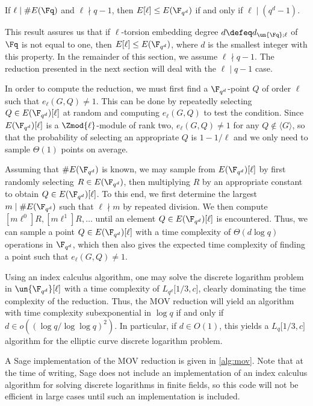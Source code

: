 \begin{thm}{}{}
If $\ell \mid \#E(\Fq)$ and $\ell \nmid q - 1$, then $E[\ell] \leq E(\F_{q^d})$ if and only if $\ell \mid (q^d - 1)$.
\end{thm}

This result assures us that if $\ell$-torsion embedding degree $d \defeq d_{\un{\Fq};\ell}$ of $\Fq$ is not equal to one, then $E[\ell] \leq E(\F_{q^d})$, where $d$ is the smallest integer with this property. In the remainder of this section, we assume $\ell \nmid q - 1$. The reduction presented in the next section will deal with the $\ell \mid q - 1$ case.

In order to compute the reduction, we must first find a $\F_{q^d}$-point $Q$ of order $\ell$ such that $e_\ell(G, Q) \neq 1$. This can be done by repeatedly selecting $Q \in E(\F_{q^d})[\ell]$ at random and computing $e_\ell(G, Q)$ to test the condition. Since $E(\F_{q^d})[\ell]$ is a $\Zmod{\ell}$-module of rank two, $e_\ell(G, Q) \neq 1$ for any $Q \notin \langle G \rangle$, so that the probability of selecting an appropriate $Q$ is $1 - 1 / \ell$ and we only need to sample $\Theta(1)$ points on average.

Assuming that $\#E(\F_{q^d})$ is known, we may sample from $E(\F_{q^d})[\ell]$ by first randomly selecting $R \in E(\F_{q^d})$, then multiplying $R$ by an appropriate constant to obtain $Q \in E(\F_{q^d})[\ell]$. To this end, we first determine the largest $m \mid \#E(\F_{q^d})$ such that $\ell \nmid m$ by repeated division. We then compute $[m \ell^0] R, [m \ell^1] R, \ldots$ until an element $Q \in E(\F_{q^d})[\ell]$ is encountered. Thus, we can sample a point $Q \in E(\F_{q^d})[\ell]$ with a time complexity of $\Theta(d \log q)$ operations in $\F_{q^d}$, which then also gives the expected time complexity of finding a point such that $e_\ell(G, Q) \neq 1$.

Using an index calculus algorithm, one may solve the discrete logarithm problem in $\un{\F_{q^d}}[\ell]$ with a time complexity of $L_{q^d}\lbrack 1/3, c \rbrack$, clearly dominating the time complexity of the reduction. Thus, the MOV reduction will yield an algorithm with time complexity subexponential in $\log q$ if and only if $d \in o((\log q / \log\log q)^2)$. In particular, if $d \in O(1)$, this yields a $L_q\lbrack 1/3, c \rbrack$ algorithm for the elliptic curve discrete logarithm problem.

A Sage implementation of the MOV reduction is given in \cref{alg:mov}. Note that at the time of writing, Sage does not include an implementation of an index calculus algorithm for solving discrete logarithms in finite fields, so this code will not be efficient in large cases until such an implementation is included.

